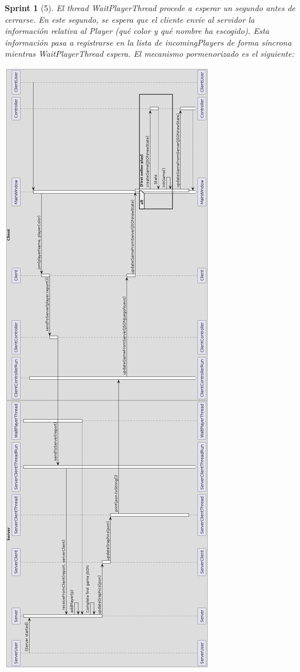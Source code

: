 \documentclass[12pt,a4paper,openright]{book}
\theoremstyle{break}
\newtheorem*{sprint}{Sprint}
\begin{document}
\begin{sprint}[5]
El thread WaitPlayerThread procede a esperar un segundo antes de cerrarse. En este segundo, se espera que el cliente envíe al servidor la información relativa al Player (qué color y qué nombre ha escogido). Esta información pasa a registrarse en la lista de incomingPlayers de forma síncrona mientras WaitPlayerThread espera. El mecanismo pormenorizado es el siguiente:

\begin{center}
\includegraphics[scale=0.4]{empezarPartidaUml.png}
\end{center}


\end{sprint}
\end{document}
